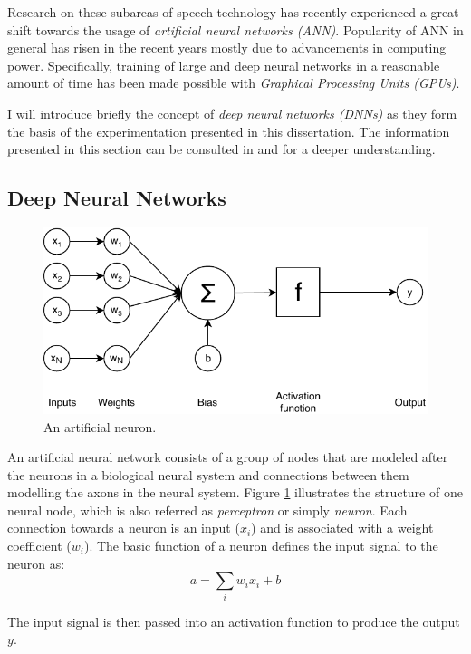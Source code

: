 Research on these subareas of speech technology has recently experienced a great shift towards the usage of \textit{artificial neural networks (ANN)}. Popularity of ANN in general has risen in the recent years mostly due to advancements in computing power. Specifically, training of large and deep neural networks in a reasonable amount of time has been made possible with \textit{Graphical Processing Units (GPUs)}.  

I will introduce briefly the concept of \textit{deep neural networks (DNNs)} as they form the basis of the experimentation presented in this dissertation. The information presented in this section can be consulted in \cite{shigeru2000handbook} and \cite{bengio_dl} for a deeper understanding. 

\subsection{Deep Neural Networks}
\label{sota:dnns}

\begin{figure}[t]
  \centering
  \includegraphics[width=0.6\linewidth]{img/perceptron.pdf}
  \caption{An artificial neuron.}
  \label{sota:neuron}
\end{figure}

An artificial neural network consists of a group of nodes that are modeled after the neurons in a biological neural system and connections between them modelling the axons in the neural system. Figure \ref{sota:neuron} illustrates the structure of one neural node, which is also referred as \textit{perceptron} or simply \textit{neuron}. Each connection towards a neuron is an input ($x_i$) and is associated with a weight coefficient ($w_i$). The basic function of a neuron defines the input signal to the neuron as:
\begin{equation}
    a = \sum _{ i }{ w_i x_i + b} 
\end{equation}

The input signal is then passed into an activation function to produce the output $y$. 

